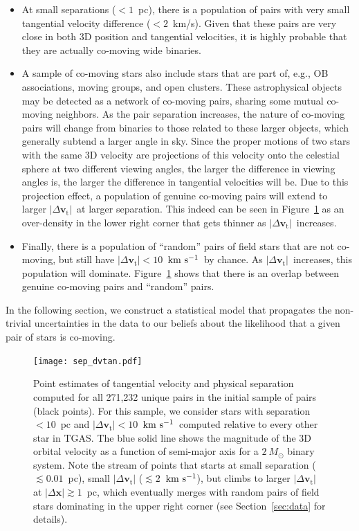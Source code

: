\documentclass[manuscript, letterpaper]{aastex6}
\newcommand{\acronym}[1]{{\small{#1}}}
\newcommand{\sectionname}{Section}
\newcommand{\tgas}{\acronym{TGAS}}
\newcommand{\bs}[1]{\boldsymbol{#1}}
\renewcommand{\vec}[1]{\bs{#1}}
\newcommand{\kms}{\ensuremath{\rm km~s^{-1}}}
\newcommand{\absdvtan}{\ensuremath{|\Delta\vec v_\mathrm{t}|}}
\begin{document}
\begin{itemize}
  \item At small separations ($<1$~pc), there is a population of pairs with
    very small tangential velocity difference ($<2$~km/s). Given that these
    pairs are very close in both 3D position and tangential velocities, it is highly
    probable that they are actually co-moving wide binaries.

  \item  A sample of co-moving stars also include stars that are part of, e.g.,
    OB associations, moving groups, and open clusters.
    These astrophysical objects may be detected as a network of co-moving pairs,
    sharing some mutual co-moving neighbors.
    As the pair separation increases, the nature of co-moving pairs
    will change from binaries to those related to these larger objects,
    which generally subtend a larger angle in sky.
    Since the proper motions of two stars with the same 3D velocity
    are projections of this velocity onto the celestial sphere at
    two different viewing angles,
    the larger the difference in viewing angles is, the larger the difference in tangential
    velocities will be.
    Due to this projection effect, a population of genuine co-moving pairs
    will extend to larger \absdvtan\ at larger separation.
    This indeed can be seen in Figure~\ref{fig:dv-sep} as an over-density
    in the lower right corner that gets thinner as \absdvtan\ increases.

  \item Finally, there is a population of “random” pairs of field stars
    that are not co-moving, but still have $\absdvtan < 10$~\kms\
    by chance.
    As \absdvtan\ increases, this population will dominate.
    Figure~\ref{fig:dv-sep} shows that there is an overlap between
    genuine co-moving pairs and “random” pairs.
\end{itemize}

In the following section, we construct a statistical model that propagates
the non-trivial uncertainties in the data to our beliefs about the likelihood
that a given pair of stars is co-moving.

\begin{figure}[htbp]
  \begin{center}
    \texttt{[image: sep\_dvtan.pdf]}
  \end{center}
  \caption{%
    Point estimates of tangential velocity and physical separation computed for
    all 271,232 unique pairs in the initial sample of pairs (black points).
    For this sample, we consider stars
    with separation $< 10$~pc and $\absdvtan < 10$~\kms\
    computed relative to every other star in \tgas.
    The blue solid line shows the magnitude of the 3D
    orbital velocity as a function of semi-major axis for a $2~M_\odot$ binary system.
    Note the stream of points that starts at small separation ($\lesssim 0.01$~pc),
    small $\absdvtan$ ($\lesssim 2$~\kms),
    but climbs to larger $\absdvtan$ at $|\Delta \vec{x}|\gtrsim 1$~pc, which
    eventually merges with random pairs of field stars dominating in the upper right corner
    (see \sectionname~\ref{sec:data} for details).
    \label{fig:dv-sep}}
\end{figure}
\end{document}
